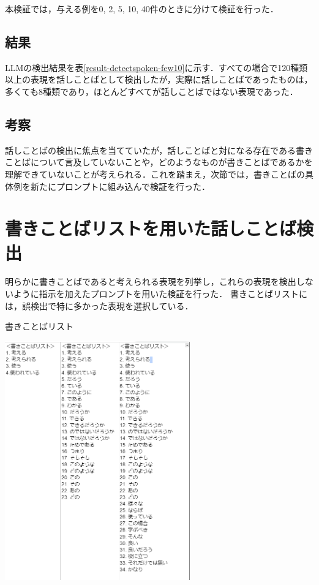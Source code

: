 本検証では，与える例を0, 2, 5, 10, 40件のときに分けて検証を行った．

\subsection{結果}
LLMの検出結果を表\ref{result-detectspoken-few10}に示す．すべての場合で120種類以上の表現を話しことばとして検出したが，実際に話しことばであったものは，多くても8種類であり，ほとんどすべてが話しことばではない表現であった．



\subsection{考察}
話しことばの検出に焦点を当てていたが，話しことばと対になる存在である書きことばについて言及していないことや，どのようなものが書きことばであるかを理解できていないことが考えられる．これを踏まえ，次節では，書きことばの具体例を新たにプロンプトに組み込んで検証を行った．

\section{書きことばリストを用いた話しことば検出 \label{c7s2}}
明らかに書きことばであると考えられる表現を列挙し，これらの表現を検出しないように指示を加えたプロンプトを用いた検証を行った．
書きことばリストには，誤検出で特に多かった表現を選択している．

\begin{table}[H]
	\centering
        \caption{書きことばリスト}
 	\includegraphics[width=80mm]{image/image-klistTable.png}
	\label{klistTable}
\end{table}

